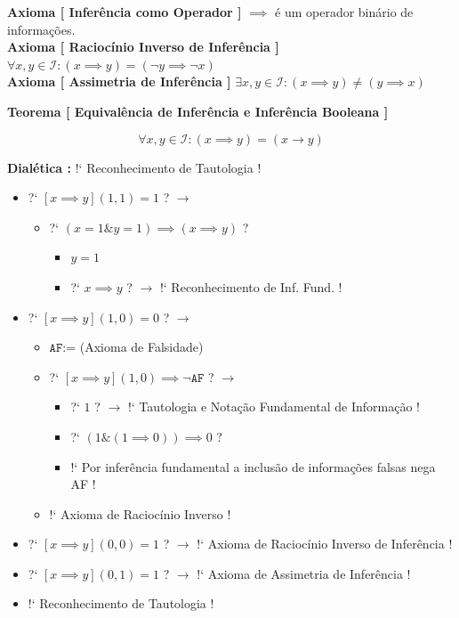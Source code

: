 \documentclass[10pt,a4paper]{report}
\begin{document}
\textbf{Axioma [ Inferência como Operador ]} $\implies$ é um operador binário de informações. \\

\textbf{Axioma [ Raciocínio Inverso de Inferência ]} $ \forall x, y \in \mathcal{I} : (x \implies y )= (\neg y \implies \neg x) $ \\

\textbf{Axioma [ Assimetria de Inferência ]} $ \exists x,y \in \mathcal{I} : (x \implies y) \ne (y \implies x) $

\hspace{\baselineskip}

\textbf{Teorema [ Equivalência de Inferência e Inferência Booleana ]} 

$$ \forall x,y \in \mathcal{I} : (x \implies y) = (x \rightarrow y) $$

\textbf{Dialética :} !` Reconhecimento de Tautologia  !

\begin{itemize}
	\item[ ] ?` $ [ x \implies y ](1,1) = 1 $ ? $\rightarrow$
	\begin{itemize}
		\item[ ] ?` $ (x=1 \& y = 1) \implies (x \implies y) $ ?
		\begin{itemize}
			\item[ ] $y=1$
			\item[ ] ?` $ x \implies y $  ? $\rightarrow$ !` Reconhecimento de Inf. Fund. !
		\end{itemize}
	\end{itemize}
	\item[ ] ?` $ [x \implies y](1,0) = 0 $  ? $\rightarrow$
	\begin{itemize}
		\item[ ] $\texttt{AF}$:= (Axioma de Falsidade)
		\item[ ] ?` $ [x \implies y](1,0) \implies \neg \texttt{AF} $  ? $\rightarrow$ 
		\begin{itemize}
			\item[ ] ?` $1$ ? $\rightarrow$ !` Tautologia e Notação Fundamental de Informação !
			\item[ ] ?` $ ( 1 \& (1 \implies 0) ) \implies 0 $  ?
			\item[ ] !` Por inferência fundamental a inclusão de informações falsas nega AF !
		\end{itemize}
		\item[ ] !` Axioma de Raciocínio Inverso !
	\end{itemize}
	\item[ ] ?` $ [x \implies y](0,0) = 1 $ ? $\rightarrow$ !` Axioma de Raciocínio Inverso de Inferência !
	\item[ ] ?` $ [ x \implies y] (0,1) = 1 $  ? $\rightarrow$ !` Axioma de Assimetria de Inferência !
	\item[ ] !` Reconhecimento de Tautologia  !
\end{itemize}
\end{document}
